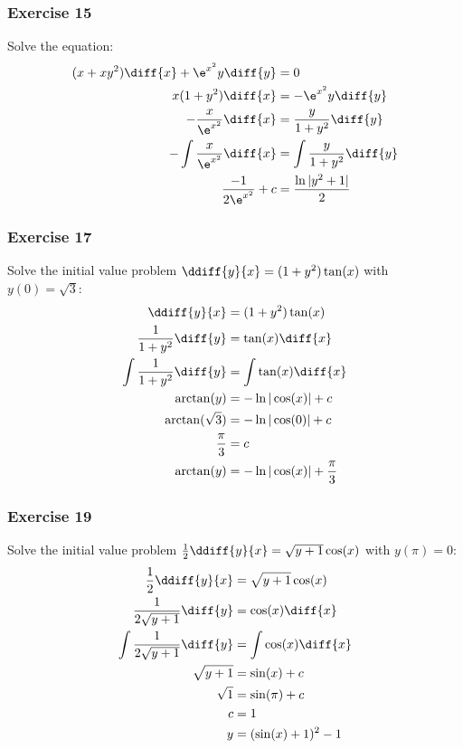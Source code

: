 \documentclass{math}
\begin{document}
\subsubsection*{Exercise 15}
Solve the equation:
\begin{align*}
  (x+xy^2)\diff{x}+\e^{x^2}y\diff{y} &= 0 \\
  x(1+y^2)\diff{x} &= -\e^{x^2}y\diff{y} \\
  -\frac{x}{\e^{x^2}}\diff{x} &= \frac{y}{1+y^2}\diff{y} \\
  -\int\frac{x}{\e^{x^2}}\diff{x} &= \int\frac{y}{1+y^2}\diff{y} \\
  \frac{-1}{2\e^{x^2}}+c &= \frac{\ln|y^2+1|}{2}
\end{align*}

\subsubsection*{Exercise 17}
Solve the initial value problem \( \ddiff{y}{x} = (1+y^2)\tan(x) \) with
\( y(0) = \sqrt{3} \):
\begin{align*}
  \ddiff{y}{x} &= (1+y^2)\tan(x) \\
  \frac{1}{1+y^2}\diff{y} &= \tan(x)\diff{x} \\
  \int\frac{1}{1+y^2}\diff{y} &= \int\tan(x)\diff{x} \\
  \arctan(y) &= -\ln|\cos(x)|+c \\
  \arctan(\sqrt{3}) &= -\ln|\cos(0)|+c \\
  \frac{\pi}{3} &= c \\
  \arctan(y) &= -\ln|\cos(x)|+\frac{\pi}{3}
\end{align*}
\clearpage

\subsubsection*{Exercise 19}
Solve the initial value problem \( \frac{1}{2}\ddiff{y}{x} =
\sqrt{y+1}\cos(x) \) with \( y(\pi) = 0 \):
\begin{align*}
  \frac{1}{2}\ddiff{y}{x} &= \sqrt{y+1}\cos(x) \\
  \frac{1}{2\sqrt{y+1}}\diff{y} &= \cos(x)\diff{x} \\
  \int\frac{1}{2\sqrt{y+1}}\diff{y} &= \int\cos(x)\diff{x} \\
  \sqrt{y+1} &= \sin(x)+c \\
  \sqrt{1} &= \sin(\pi)+c \\
  c &= 1 \\
  y &= (\sin(x)+1)^2-1
\end{align*}
\end{document}
